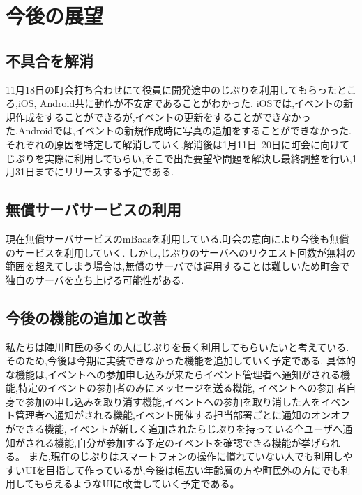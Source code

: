 \chapter{今後の展望}

\section{不具合を解消}
11月18日の町会打ち合わせにて役員に開発途中のじぷりを利用してもらったところ,iOS, Android共に動作が不安定であることがわかった.
iOSでは,イベントの新規作成をすることができるが,イベントの更新をすることができなかった.Androidでは,イベントの新規作成時に写真の追加をすることができなかった.
それぞれの原因を特定して解消していく.解消後は1月11日~20日に町会に向けてじぷりを実際に利用してもらい,そこで出た要望や問題を解決し最終調整を行い,1月31日までにリリースする予定である.

\section{無償サーバサービスの利用}
現在無償サーバサービスのmBaasを利用している.町会の意向により今後も無償のサービスを利用していく.
しかし,じぷりのサーバへのリクエスト回数が無料の範囲を超えてしまう場合は,無償のサーバでは運用することは難しいため町会で独自のサーバを立ち上げる可能性がある.

\section{今後の機能の追加と改善}
私たちは陣川町民の多くの人にじぷりを長く利用してもらいたいと考えている.
そのため,今後は今期に実装できなかった機能を追加していく予定である.
具体的な機能は,イベントへの参加申し込みが来たらイベント管理者へ通知がされる機能,特定のイベントの参加者のみにメッセージを送る機能,
イベントへの参加者自身で参加の申し込みを取り消す機能,イベントへの参加を取り消した人をイベント管理者へ通知がされる機能,イベント開催する担当部署ごとに通知のオンオフができる機能,
イベントが新しく追加されたらじぷりを持っている全ユーザへ通知がされる機能,自分が参加する予定のイベントを確認できる機能が挙げられる。
また,現在のじぷりはスマートフォンの操作に慣れていない人でも利用しやすいUIを目指して作っているが,今後は幅広い年齢層の方や町民外の方にでも利用してもらえるようなUIに改善していく予定である。
